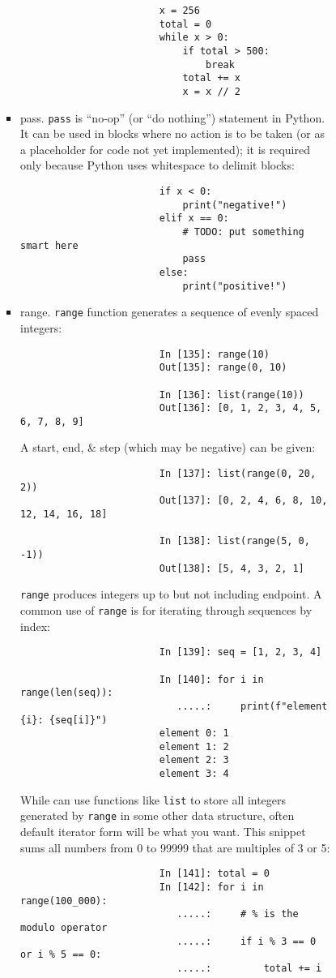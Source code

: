 \documentclass{article}
\begin{document}
\begin{enumerate}
\begin{itemize}
\begin{itemize}
\begin{itemize}
\begin{itemize}
					\begin{verbatim}
						x = 256
						total = 0
						while x > 0:
						    if total > 500:
						        break
						    total += x
						    x = x // 2
					\end{verbatim}
					\item {\sf pass.} {\tt pass} is ``no-op'' (or ``do nothing'') statement in Python. It can be used in blocks where no action is to be taken (or as a placeholder for code not yet implemented); it is required only because Python uses whitespace to delimit blocks:
					\begin{verbatim}
						if x < 0:
						    print("negative!")
						elif x == 0:
						    # TODO: put something smart here
						    pass
						else:
						    print("positive!")
					\end{verbatim}
					\item {\sf range.} {\tt range} function generates a sequence of evenly spaced integers:
					\begin{verbatim}
						In [135]: range(10)
						Out[135]: range(0, 10)
						
						In [136]: list(range(10))
						Out[136]: [0, 1, 2, 3, 4, 5, 6, 7, 8, 9]
					\end{verbatim}
					A start, end, \& step (which may be negative) can be given:
					\begin{verbatim}
						In [137]: list(range(0, 20, 2))
						Out[137]: [0, 2, 4, 6, 8, 10, 12, 14, 16, 18]
						
						In [138]: list(range(5, 0, -1))
						Out[138]: [5, 4, 3, 2, 1]
					\end{verbatim}
					{\tt range} produces integers up to but not including endpoint. A common use of {\tt range} is for iterating through sequences by index:
					\begin{verbatim}
						In [139]: seq = [1, 2, 3, 4]
						
						In [140]: for i in range(len(seq)):
						   .....:     print(f"element {i}: {seq[i]}")
						element 0: 1
						element 1: 2
						element 2: 3
						element 3: 4
					\end{verbatim}
					While can use functions like {\tt list} to store all integers generated by {\tt range} in some other data structure, often default iterator form will be what you want. This snippet sums all numbers from 0 to 99999 that are multiples of 3 or 5:
					\begin{verbatim}
						In [141]: total = 0
						In [142]: for i in range(100_000):
						   .....:     # % is the modulo operator
						   .....:     if i % 3 == 0 or i % 5 == 0:
						   .....:         total += i
						   

\end{verbatim}
\end{itemize}
\end{itemize}
\end{itemize}
\end{itemize}
\end{enumerate}
\end{document}
